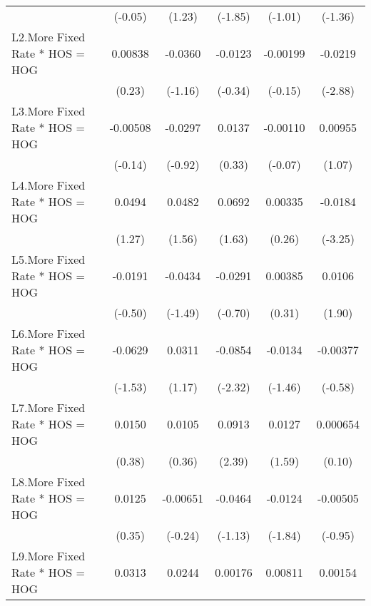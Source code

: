 {\begin{tabular}{l*{5}{c}}
                &  (-0.05)         &   (1.23)         &  (-1.85)         &  (-1.01)         &  (-1.36)         \\
[1em]
L2.More Fixed Rate * HOS = HOG&  0.00838         &  -0.0360         &  -0.0123         & -0.00199         &  -0.0219\sym{**} \\
                &   (0.23)         &  (-1.16)         &  (-0.34)         &  (-0.15)         &  (-2.88)         \\
[1em]
L3.More Fixed Rate * HOS = HOG& -0.00508         &  -0.0297         &   0.0137         & -0.00110         &  0.00955         \\
                &  (-0.14)         &  (-0.92)         &   (0.33)         &  (-0.07)         &   (1.07)         \\
[1em]
L4.More Fixed Rate * HOS = HOG&   0.0494         &   0.0482         &   0.0692         &  0.00335         &  -0.0184\sym{**} \\
                &   (1.27)         &   (1.56)         &   (1.63)         &   (0.26)         &  (-3.25)         \\
[1em]
L5.More Fixed Rate * HOS = HOG&  -0.0191         &  -0.0434         &  -0.0291         &  0.00385         &   0.0106         \\
                &  (-0.50)         &  (-1.49)         &  (-0.70)         &   (0.31)         &   (1.90)         \\
[1em]
L6.More Fixed Rate * HOS = HOG&  -0.0629         &   0.0311         &  -0.0854\sym{*}  &  -0.0134         & -0.00377         \\
                &  (-1.53)         &   (1.17)         &  (-2.32)         &  (-1.46)         &  (-0.58)         \\
[1em]
L7.More Fixed Rate * HOS = HOG&   0.0150         &   0.0105         &   0.0913\sym{*}  &   0.0127         & 0.000654         \\
                &   (0.38)         &   (0.36)         &   (2.39)         &   (1.59)         &   (0.10)         \\
[1em]
L8.More Fixed Rate * HOS = HOG&   0.0125         & -0.00651         &  -0.0464         &  -0.0124         & -0.00505         \\
                &   (0.35)         &  (-0.24)         &  (-1.13)         &  (-1.84)         &  (-0.95)         \\
[1em]
L9.More Fixed Rate * HOS = HOG&   0.0313         &   0.0244         &  0.00176         &  0.00811         &  0.00154         \\

\end{tabular}}
